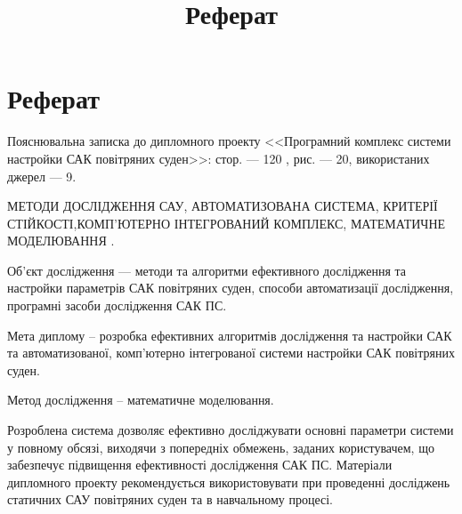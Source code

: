 \documentclass[ukrainian,utf8,simple]{eskdtext}
\title{Реферат}
\begin{document}
\section*{Реферат}
Пояснювальна записка до дипломного проекту <<Програмний комплекс системи настройки САК повітряних суден>>: стор. --- 120  , рис. --- 20, використаних джерел --- 9.


МЕТОДИ ДОСЛІДЖЕННЯ САУ, АВТОМАТИЗОВАНА СИСТЕМА, КРИТЕРІЇ СТІЙКОСТІ,КОМП’ЮТЕРНО ІНТЕГРОВАНИЙ КОМПЛЕКС, МАТЕМАТИЧНЕ МОДЕЛЮВАННЯ .

Об’єкт дослідження --- методи та алгоритми ефективного дослідження та настройки параметрів САК повітряних суден, способи автоматизації дослідження, програмні засоби дослідження САК ПС.

Мета диплому – розробка ефективних алгоритмів дослідження та настройки САК та автоматизованої, комп’ютерно інтегрованої системи настройки САК повітряних суден.

Метод дослідження – математичне моделювання.

Розроблена система дозволяє ефективно досліджувати основні параметри системи у повному обсязі, виходячи з попередніх обмежень, заданих користувачем, що забезпечує підвищення ефективності дослідження САК ПС. Матеріали дипломного проекту рекомендується використовувати при проведенні досліджень статичних САУ повітряних суден та в навчальному процесі.
\end{document}
